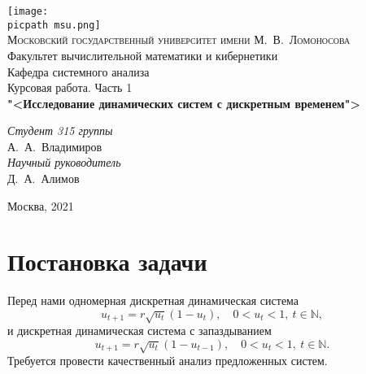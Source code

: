 \documentclass[oneside,final,12pt]{article}
\newcommand*\Na {\mathbb{N}}
\newcommand*\picpath{pictures/}
\theoremstyle{plain}
\theoremstyle{remark}
\theoremstyle{definition}
\theoremstyle{plain}
\begin{document}
	\begin{titlepage}
		\begin{centering}
			\texttt{[image: \\picpath msu.png]}\\
			{\scshape Московский государственный университет имени М.~В.~Ломоносова}\\
			Факультет вычислительной математики и кибернетики\\
			Кафедра системного анализа\\
			\vfill
			{\LARGE Курсовая работа. Часть 1}\\
			\vspace{1cm}
			{\Huge\bfseries "<Исследование динамических систем с дискретным временем">\\}
		\end{centering}
		\vspace{1cm}
		\begin{flushright}
			\begin{large}
				{\itshape Студент 315 группы\\}
				А.~А.~Владимиров\\
				\vspace{5mm}
				{\itshape Научный руководитель\\}
				Д.~А.~Алимов\\
			\end{large}
		\end{flushright}
		\vfill
		\begin{centering}
			Москва, 2021\\ 
		\end{centering}
	\newpage
	\end{titlepage}
	\setcounter{page}{2}
	
	\tableofcontents

	\section{Постановка задачи}\label{sec_task}
		
		Перед нами одномерная дискретная динамическая система
	\begin{equation} \label{ds1}
		u_{t+1} = r \sqrt{u_t} (1-u_t), \quad 0 < u_t < 1, \: t \in \Na,
	\end{equation}
		и дискретная динамическая система с запаздыванием
	\begin{equation} \label{ds2}
		u_{t+1} = r \sqrt{u_t} (1-u_{t-1}), \quad 0 < u_t < 1, \: t \in \Na.
	\end{equation}
		Требуется провести качественный анализ предложенных систем.
\end{document}
